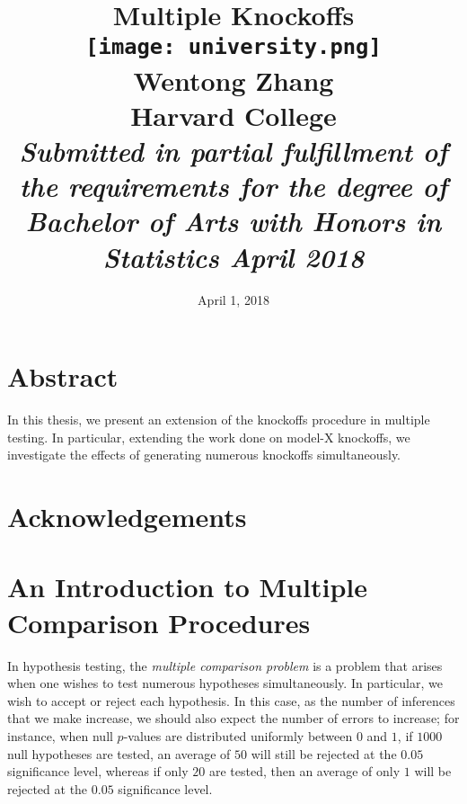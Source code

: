 \documentclass[11pt,reqno]{report}
\title{
	{\Huge \bf Multiple Knockoffs}\\ \vspace*{1cm}
	{\texttt{[image: university.png]}} \\
	{\huge Wentong Zhang \\ \LARGE Harvard College}\\ \vspace*{1cm}
	{\Large \it Submitted in partial fulfillment of the
requirements for the degree of Bachelor
of Arts with Honors in Statistics
April 2018}
}
\date{\Large April 1, 2018}
\theoremstyle{definition}
\numberwithin{equation}{section}
\begin{document}
\maketitle

\chapter*{Abstract}
In this thesis, we present an extension of the knockoffs procedure in multiple testing. In particular, extending the work done on model-X knockoffs, we investigate the effects of generating numerous knockoffs simultaneously. 

\chapter*{Acknowledgements}



\doublespacing
\tableofcontents
\onehalfspacing

\chapter{An Introduction to Multiple Comparison Procedures}
\label{chapter1}
In hypothesis testing, the \emph{multiple comparison problem} is a problem that arises when one wishes to test numerous hypotheses simultaneously. In particular, we wish to accept or reject each hypothesis. In this case, as the number of inferences that we make increase, we should also expect the number of errors to increase; for instance, when null $p$-values are distributed uniformly between $0$ and $1$, if $1000$ null hypotheses are tested, an average of $50$ will still be rejected at the $0.05$ significance level, whereas if only $20$ are tested, then an average of only $1$ will be rejected at the $0.05$ significance level.
\end{document}
